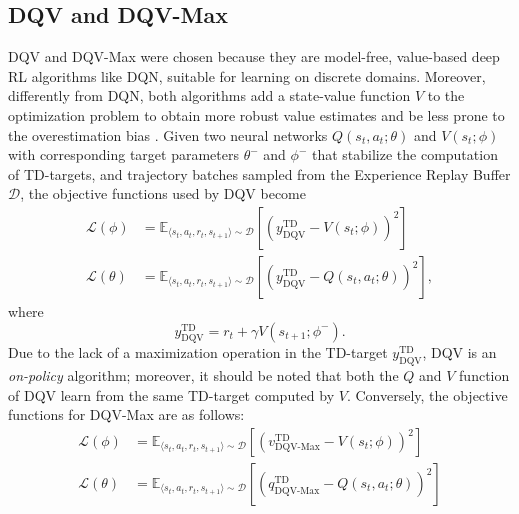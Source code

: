 \subsection{DQV and DQV-Max}
DQV and DQV-Max were chosen because they are model-free, value-based
deep RL algorithms like DQN, suitable for learning on discrete
domains. Moreover, differently from DQN, both algorithms add
a state-value function $V$ to the optimization problem to
obtain more robust value estimates and be less prone to the
overestimation bias \citep{sabatelli2020deep}. Given two neural
networks $Q\left(s_t,a_t;\theta\right)$ and $V\left(s_t;\phi\right)$
with corresponding target parameters $\theta^-$ and $\phi^-$ that
stabilize the computation of TD-targets, and trajectory batches
sampled from the Experience Replay Buffer $\mathcal{D}$, the objective
functions used by DQV become
\begin{align}
\mathcal{L}\left(\phi\right)&=\mathbb{E}_{\langle
                              s_t,a_t,r_t,s_{t+1}\rangle\sim
                              \mathcal{D}}\left[{\left(y^{\scriptscriptstyle
                              \textrm{TD}}_{\scriptscriptstyle
                              \textrm{DQV}}-V\left(s_t;\phi\right)\right)}^2\right]\label{eq:dqv_loss_0}
  \\
\mathcal{L}\left(\theta\right)&=\mathbb{E}_{\langle
                                s_t,a_t,r_t,s_{t+1}\rangle\sim
                                \mathcal{D}}\left[{\left(y^{\scriptscriptstyle
                                \textrm{TD}}_{\scriptscriptstyle
                                \textrm{DQV}}-Q\left(s_t,a_t;\theta\right)\right)}^2\right],\label{eq:dqv_loss_1}
\end{align}
where
\begin{equation}
  y^{\scriptscriptstyle \textrm{TD}}_{\scriptscriptstyle
    \textrm{DQV}}=r_t+\gamma V\left(s_{t+1};\phi^{-}\right).
\end{equation}
Due to the lack of a maximization operation in the TD-target
$y^{\scriptscriptstyle \textrm{TD}}_{\scriptscriptstyle
  \textrm{DQV}}$, DQV is an \textit{on-policy} algorithm; moreover, it
should
be noted that both the $Q$ and $V$ function of DQV learn from the same
TD-target computed by $V$. Conversely, the objective functions for
DQV-Max are as follows:
\begin{align}
\mathcal{L}\left(\phi\right)&=\mathbb{E}_{\langle
                              s_t,a_t,r_t,s_{t+1}\rangle\sim
                              \mathcal{D}}\left[{\left(v^{\scriptscriptstyle
                              \textrm{TD}}_{\scriptscriptstyle
                              \textrm{DQV-Max}}-V\left(s_t;\phi\right)\right)}^2\right]
  \\
\mathcal{L}\left(\theta\right)&=\mathbb{E}_{\langle
                                s_t,a_t,r_t,s_{t+1}\rangle\sim
                                \mathcal{D}}\left[{\left(q^{\scriptscriptstyle
                                \textrm{TD}}_{\scriptscriptstyle
                                \textrm{DQV-Max}}-Q\left(s_t,a_t;\theta\right)\right)}^2\right]
\end{align}
